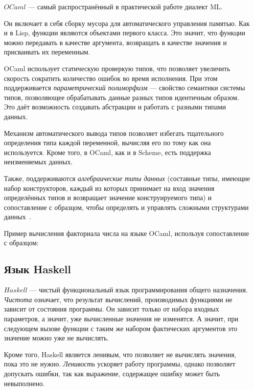         $OCaml$ --- самый распространённый в практической работе диалект ML.

        Он включает в себя сборку мусора для автоматического управления памятью.
        Как и в Lisp, функции являются объектами первого класса.
        Это значит, что функции можно передавать в качестве аргумента, возвращать в качестве значения и присваивать их переменным.

        OCaml использует статическую проверкую типов, что позволяет увеличить скорость сократить количество ошибок во время исполнения.
        При этом поддерживается \textit{параметрический полиморфизм} --- свойство семантики системы типов, позволяющее обрабатывать данные разных типов идентичным образом.
        Это даёт возможность создавать абстракции и работать с разными типами данных.

        Механизм автоматического вывода типов позволяет избегать тщательного определения типа каждой переменной, вычисляя его по тому как она используется.
        Кроме того, в OCaml, как и в Scheme, есть поддержка неизменяемых данных.

        Также, поддерживаются \textit{алгебраические типы данных} (составные типы, имеющие набор конструкторов, каждый из которых принимает на вход значения определённых типов и возвращает значение конструируемого типа) и сопоставление с образцом, чтобы определять и управлять сложными структурами данных~\cite{ocaml}.

        Пример вычисления факториала числа на языке OCaml, используя сопоставление с образцом:

        

    \subsection{Язык Haskell}
        $Haskell$ --- чистый функциональный язык программирования общего назначения.
        \textit{Чистота} означает, что результат вычислений, производимых функциями не зависит от состояния программы.
        Он зависит только от набора входных параметров, а значит, уже вычисленные значения не изменятся.
        А значит, при следующем вызове функции с таким же набором фактических аргументов это значение можно уже не вычислять.

        Кроме того, Haskell является ленивым, что позволяет не вычислять значения, пока это не нужно.
        \textit{Ленивость} ускоряет работу программы, однако позволяет допускать ошибки, так как выражение, содержащее ошибку может быть невыполнено.

